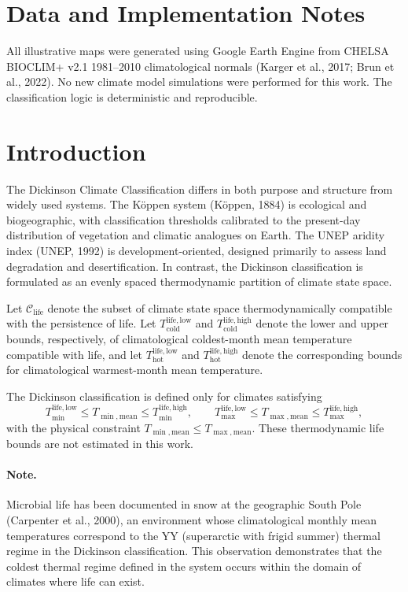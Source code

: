 \documentclass[12pt]{article}
\newcommand{\cold}{\mathrm{cold}}
\newcommand{\hot}{\mathrm{hot}}
\begin{document}
\section*{Data and Implementation Notes}

All illustrative maps were generated using Google Earth Engine
from CHELSA BIOCLIM+ v2.1 1981--2010 climatological normals (Karger et al., 2017; Brun et al., 2022). No new climate model simulations were performed for this work.
The classification logic is deterministic and reproducible.

\section*{Introduction}

The Dickinson Climate Classification differs in both purpose
and structure from widely used systems. The Köppen system (Köppen, 1884) is ecological and biogeographic, with classification thresholds calibrated to the present-day distribution of vegetation and climatic analogues on Earth. The UNEP aridity index (UNEP, 1992) is development-oriented, designed primarily to assess land
degradation and desertification. In contrast, the Dickinson classification is formulated
as an evenly spaced thermodynamic partition of climate state space.

Let $\mathcal{C}_{\mathrm{life}}$ denote the subset of climate state space thermodynamically compatible with the persistence of life.
Let $T_{\cold}^{\mathrm{life,low}}$ and
$T_{\cold}^{\mathrm{life,high}}$ denote the lower and upper bounds,
respectively, of climatological coldest-month mean temperature compatible
with life, and let $T_{\hot}^{\mathrm{life,low}}$ and
$T_{\hot}^{\mathrm{life,high}}$ denote the corresponding bounds for
climatological warmest-month mean temperature.

The Dickinson classification is defined only for climates satisfying
\[
T_{\min}^{\mathrm{life,low}} \le T_{\min,\mathrm{mean}}
\le T_{\min}^{\mathrm{life,high}}, \qquad
T_{\max}^{\mathrm{life,low}} \le T_{\max,\mathrm{mean}}
\le T_{\max}^{\mathrm{life,high}},
\]
with the physical constraint $T_{\min,\mathrm{mean}} \le T_{\max,\mathrm{mean}}$.
These thermodynamic life bounds are not estimated in this work.

\paragraph{Note.} Microbial life has been documented in snow at the geographic
South Pole (Carpenter et al., 2000), an environment whose
climatological monthly mean temperatures correspond to the
YY (superarctic with frigid summer) thermal regime in the
Dickinson classification. This observation demonstrates that
the coldest thermal regime defined in the system occurs within
the domain of climates where life can exist.
\end{document}
